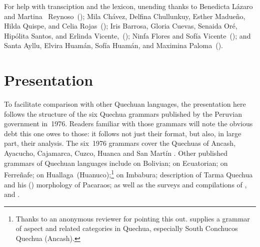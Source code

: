 \vspace{2\baselineskip}
For help with transciption and the lexicon, unending thanks to \foreignlanguage{spanish}{Benedicta Lázaro} and Martina \ Reynoso~(\ACH); Mila Chávez, Delfina Chullunkuy, \foreignlanguage{spanish}{Esther Madueño}, Hilda Quispe, and Celia Rojas~(\AMV); Iris Barrosa, Gloria Cuevas, Senaida Oré, Hipólita Santos, and Erlinda Vicente,~(\CH); Ninfa Flores and Sofía Vicente~(\LT); and Santa Ayllu, Elvira Huamán, Sofía Huamán, and Maximina Paloma~(\SP).

\section{Presentation}\label{sec:presentation}
To facilitate comparison with other Quechuan languages, the presentation here follows the structure of the six Quechua grammars published by the Peruvian government in~1976. Readers familiar with those grammars will note the obvious debt this one owes to those: it follows not just their format, but also, in large part, their analysis. The six~1976 grammars cover the Quechuas of Ancash, Ayacucho, Cajamarca, Cuzco, Huanca and San Martín \citep{Parker76gram,Soto76a,Quesada76,Cusihuaman76,CerroP76a,Coombs76}. Other published grammars of Quechuan languages include \citet{Herrero78} on Bolivian; \citet{Catta94} on Ecuatorian; \citet{Taylor94a} on Ferreñafe; \citet{Weber89} on Huallaga~(Huanuco);\footnote{Thanks to an anonymous reviewer for pointing this out. \citet{Hintz} supplies a grammar of aspect and related categories in Quechua, especially South Conchucos Quechua (Ancash).} \citet{Cole82} on Imbabura; \citet{Adelaar77} description of Tarma Quechua and his (\citeyear{Adelaar86}) morphology of Pacaraos; 
as well as the surveys and compilations of \citet{CerroP87,CerroP90}, and \citet{Cole94}.

